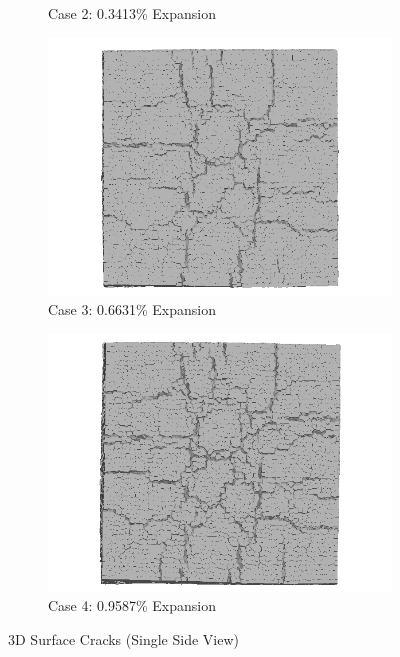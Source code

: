 \begin{figure}[!h]
\begin{subfigure}{.5\textwidth}
    \caption{Case 2: 0.3413\% Expansion}
    \end{subfigure}%
    \begin{subfigure}{.5\textwidth}
      \centering
      \includegraphics[width=.8\linewidth]{Files/exp_3D/DEF/A15X0C_3_3ds.png}
    \caption{Case 3: 0.6631\% Expansion}
    \end{subfigure}
    \begin{subfigure}{.5\textwidth}
      \centering
      \includegraphics[width=.8\linewidth]{Files/exp_3D/DEF/A15X0C_4_3ds.png}
    \caption{Case 4: 0.9587\% Expansion}
    \end{subfigure}%

  \caption{3D Surface Cracks (Single Side View)}
  \label{fig:DEF_A15X0C_3DS}
\end{figure}

